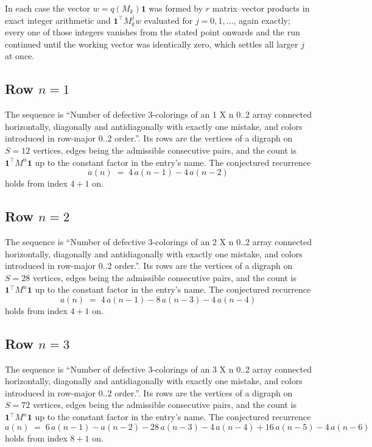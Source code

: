 \documentclass[11pt,a4paper]{article}
\theoremstyle{plain}
\theoremstyle{definition}
\begin{document}
In each case the vector $w=q(M_k)\mathbf{1}$ was formed by $r$ matrix--vector products in
exact integer arithmetic and $\mathbf{1}^{\!\top}M_k^{j}w$ evaluated for $j=0,1,\dots$,
again exactly; every one of those integers vanishes from the stated point onwards and the run
continued until the working vector was identically zero, which settles all larger $j$ at once.

\subsection*{Row $n$$=1$}
The sequence is ``Number of defective 3-colorings of an 1 X n 0..2 array connected horizontally, diagonally and antidiagonally with exactly one mistake, and colors introduced in row-major 0..2 order.''. Its rows are the vertices of a digraph on
$S=12$ vertices, edges being the admissible consecutive pairs, and the count is
$\mathbf{1}^{\!\top}M^{n}\mathbf{1}$ up to the constant factor in the entry's name.
The conjectured recurrence
\[
a(n)\;=\;4\,a(n-1) - 4\,a(n-2)
\]
holds from index $4+1$ on.

\subsection*{Row $n$$=2$}
The sequence is ``Number of defective 3-colorings of an 2 X n 0..2 array connected horizontally, diagonally and antidiagonally with exactly one mistake, and colors introduced in row-major 0..2 order.''. Its rows are the vertices of a digraph on
$S=28$ vertices, edges being the admissible consecutive pairs, and the count is
$\mathbf{1}^{\!\top}M^{n}\mathbf{1}$ up to the constant factor in the entry's name.
The conjectured recurrence
\[
a(n)\;=\;4\,a(n-1) - 8\,a(n-3) - 4\,a(n-4)
\]
holds from index $4+1$ on.

\subsection*{Row $n$$=3$}
The sequence is ``Number of defective 3-colorings of an 3 X n 0..2 array connected horizontally, diagonally and antidiagonally with exactly one mistake, and colors introduced in row-major 0..2 order.''. Its rows are the vertices of a digraph on
$S=72$ vertices, edges being the admissible consecutive pairs, and the count is
$\mathbf{1}^{\!\top}M^{n}\mathbf{1}$ up to the constant factor in the entry's name.
The conjectured recurrence
\[
a(n)\;=\;6\,a(n-1) - a(n-2) - 28\,a(n-3) - 4\,a(n-4) + 16\,a(n-5) - 4\,a(n-6)
\]
holds from index $8+1$ on.
\end{document}
